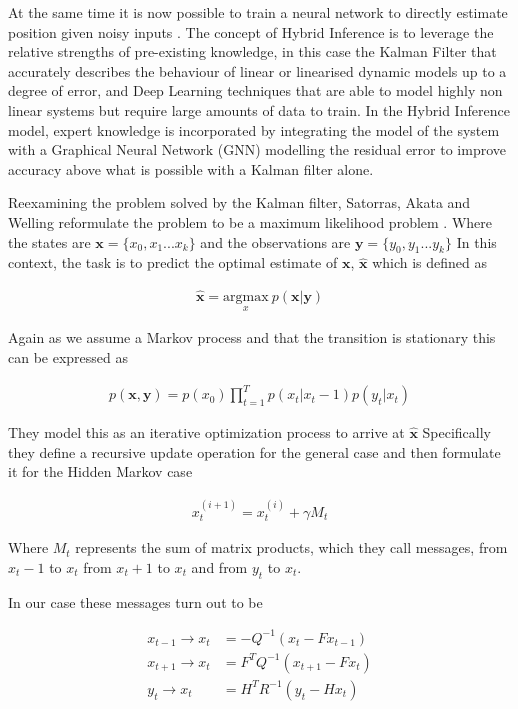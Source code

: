 \documentclass[]{../resources/final_report}
\begin{document}
At the same time it is now possible to train a neural network to directly estimate position given noisy inputs \cite{NNStateEstimation}. The concept of Hybrid Inference is to leverage the relative strengths of pre-existing knowledge, in this case the Kalman Filter that accurately describes the behaviour of linear or linearised dynamic models up to a degree of error, and Deep Learning techniques that are able to model highly non linear systems but require large amounts of data to train. In the Hybrid Inference model, expert knowledge is incorporated by integrating the model of the system with a Graphical Neural Network (GNN) modelling the residual error to improve accuracy above what is possible with a Kalman filter alone.


Reexamining the problem solved by the Kalman filter, Satorras, Akata and Welling reformulate the problem to be a maximum likelihood problem \cite{Satorras2019CombiningGA}. Where the states are $\mathbf{x} = \{x_0, x_1 ... x_k\}$ and the observations are $\mathbf{y} = \{y_0, y_1 ... y_k\}$ In this context, the task is to predict the optimal estimate of $\mathbf{x}$, $\mathbf{\hat{x}}$ which is defined as

\begin{align}
  \mathbf{\hat{x}} = \underset{x}{\text{argmax}}\ p(\mathbf{x}|\mathbf{y})
\end{align}

Again as we assume a Markov process and that the transition is stationary this can be expressed as 

\begin{align}
  p(\mathbf{x},\mathbf{y}) = p(x_0)\prod_{t=1}^T p(x_t|x_t-1) p(y_t|x_t)
\end{align}

They model this as an iterative optimization process to arrive at $\mathbf{\hat{x}}$ Specifically they define a recursive update operation for the general case and then formulate it 
for the Hidden Markov case

\begin{align}
  x_t^{(i+1)} = x_t^{(i)} + \gamma M_t
\end{align}

Where $M_t$ represents the sum of matrix products, which they call messages, from $x_t-1$ to $x_t$ from $x_t+1$ to $x_t$ and from $y_t$ to $x_t$.

In our case these messages turn out to be

\begin{align}
  x_{t-1} \rightarrow x_{t} &= -Q^{-1}(x_t - Fx_{t-1}) \\
  x_{t+1} \rightarrow x_{t} &= F^TQ^{-1}(x_{t+1} - Fx_t) \\
  y_t \rightarrow x_t &= H^TR^{-1}(y_t - Hx_t) 
\end{align}
\end{document}
